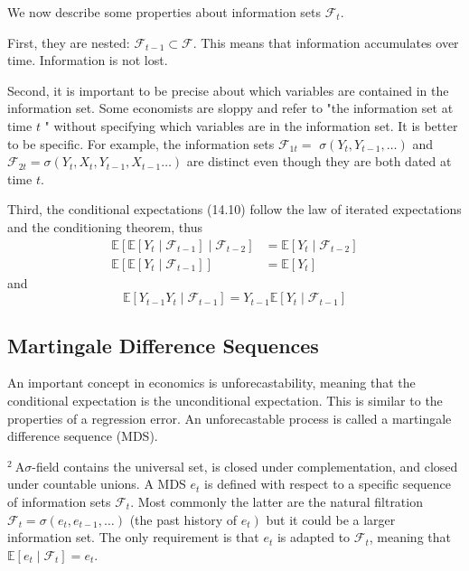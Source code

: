 \documentclass[10pt]{article}
\begin{document}
We now describe some properties about information sets $\mathscr{F}_{t}$.

First, they are nested: $\mathscr{F}_{t-1} \subset \mathscr{F}$. This means that information accumulates over time. Information is not lost.

Second, it is important to be precise about which variables are contained in the information set. Some economists are sloppy and refer to "the information set at time $t$ " without specifying which variables are in the information set. It is better to be specific. For example, the information sets $\mathscr{F}_{1 t}=$ $\sigma\left(Y_{t}, Y_{t-1}, \ldots\right)$ and $\mathscr{F}_{2 t}=\sigma\left(Y_{t}, X_{t}, Y_{t-1}, X_{t-1} \ldots\right)$ are distinct even though they are both dated at time $t$.

Third, the conditional expectations (14.10) follow the law of iterated expectations and the conditioning theorem, thus
$$
\begin{aligned}
\mathbb{E}\left[\mathbb{E}\left[Y_{t} \mid \mathscr{F}_{t-1}\right] \mid \mathscr{F}_{t-2}\right] &=\mathbb{E}\left[Y_{t} \mid \mathscr{F}_{t-2}\right] \\
\mathbb{E}\left[\mathbb{E}\left[Y_{t} \mid \mathscr{F}_{t-1}\right]\right] &=\mathbb{E}\left[Y_{t}\right]
\end{aligned}
$$
and
$$
\mathbb{E}\left[Y_{t-1} Y_{t} \mid \mathscr{F}_{t-1}\right]=Y_{t-1} \mathbb{E}\left[Y_{t} \mid \mathscr{F}_{t-1}\right]
$$

\subsection{Martingale Difference Sequences}
An important concept in economics is unforecastability, meaning that the conditional expectation is the unconditional expectation. This is similar to the properties of a regression error. An unforecastable process is called a martingale difference sequence (MDS).

${ }^{2} \mathrm{~A} \sigma$-field contains the universal set, is closed under complementation, and closed under countable unions. A MDS $e_{t}$ is defined with respect to a specific sequence of information sets $\mathscr{F}_{t}$. Most commonly the latter are the natural filtration $\mathscr{F}_{t}=\sigma\left(e_{t}, e_{t-1}, \ldots\right)$ (the past history of $\left.e_{t}\right)$ but it could be a larger information set. The only requirement is that $e_{t}$ is adapted to $\mathscr{F}_{t}$, meaning that $\mathbb{E}\left[e_{t} \mid \mathscr{F}_{t}\right]=e_{t}$.
\end{document}
